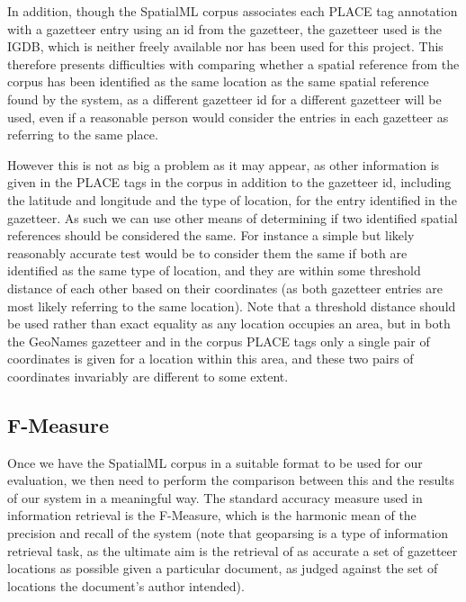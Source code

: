 \documentclass[12pt, a4paper]{report}
\begin{document}
In addition, though the SpatialML corpus associates each PLACE tag annotation with a gazetteer entry using an id from the gazetteer, the gazetteer used is the IGDB, which is neither freely available nor has been used for this project. This therefore presents difficulties with comparing whether a spatial reference from the corpus has been identified as the same location as the same spatial reference found by the system, as a different gazetteer id for a different gazetteer will be used, even if a reasonable person would consider the entries in each gazetteer as referring to the same place.

However this is not as big a problem as it may appear, as other information is given in the PLACE tags in the corpus in addition to the gazetteer id, including the latitude and longitude and the type of location, for the entry identified in the gazetteer. As such we can use other means of determining if two identified spatial references should be considered the same. For instance a simple but likely reasonably accurate test would be to consider them the same if both are identified as the same type of location, and they are within some threshold distance of each other based on their coordinates (as both gazetteer entries are most likely referring to the same location). Note that a threshold distance should be used rather than exact equality as any location occupies an area, but in both the GeoNames gazetteer and in the corpus PLACE tags only a single pair of coordinates is given for a location within this area, and these two pairs of coordinates invariably are different to some extent.




\subsection{F-Measure}

Once we have the SpatialML corpus in a suitable format to be used for our evaluation, we then need to perform the comparison between this and the results of our system in a meaningful way. The standard accuracy measure used in information retrieval is the F-Measure, which is the harmonic mean of the precision and recall of the system (note that geoparsing is a type of information retrieval task, as the ultimate aim is the retrieval of as accurate a set of gazetteer locations as possible given a particular document, as judged against the set of locations the document's author intended).
\end{document}
